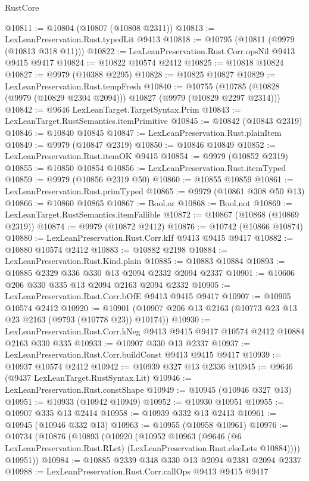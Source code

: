 \begin{lexlean}{RustCore}
\begin{coremodule}
@10811 := @10804 (@10807 (@10808 @2311))
@10813 := LexLeanPreservation.Rust.typedLit @9413
@10818 := @10795 (@10811 (@9979 (@10813 @318 @11)))
@10822 := LexLeanPreservation.Rust.Corr.opsNil @9413 @9415 @9417
@10824 := @10822 @10574 @2412
@10825 := @10818 @10824
@10827 := @9979 (@10388 @2295)
@10828 := @10825 @10827
@10829 := LexLeanPreservation.Rust.tempFresh
@10840 := @10755 (@10785 (@10828 (@9979 (@10829 @2304 @2094))) @10827 (@9979 (@10829 @2297 @2314)))
@10842 := @9646 LexLeanTarget.TargetSyntax.Prim
@10843 := LexLeanTarget.RustSemantics.itemPrimitive
@10845 := @10842 (@10843 @2319)
@10846 := @10840 @10845
@10847 := LexLeanPreservation.Rust.plainItem
@10849 := @9979 (@10847 @2319)
@10850 := @10846 @10849
@10852 := LexLeanPreservation.Rust.itemOK @9415
@10854 := @9979 (@10852 @2319)
@10855 := @10850 @10854
@10856 := LexLeanPreservation.Rust.itemTyped
@10859 := @9979 (@10856 @2319 @50)
@10860 := @10855 @10859
@10861 := LexLeanPreservation.Rust.primTyped
@10865 := @9979 (@10861 @308 @50 @13)
@10866 := @10860 @10865
@10867 := Bool.or
@10868 := Bool.not
@10869 := LexLeanTarget.RustSemantics.itemFallible
@10872 := @10867 (@10868 (@10869 @2319))
@10874 := @9979 (@10872 @2412)
@10876 := @10742 (@10866 @10874)
@10880 := LexLeanPreservation.Rust.Corr.kIf @9413 @9415 @9417
@10882 := @10880 @10574 @2412
@10883 := @10882 @2198
@10884 := LexLeanPreservation.Rust.Kind.plain
@10885 := @10883 @10884
@10893 := @10885 @2329 @336 @330 @13 @2094 @2332 @2094 @2337
@10901 := @10606 @206 @330 @335 @13 @2094 @2163 @2094 @2332
@10905 := LexLeanPreservation.Rust.Corr.bOfE @9413 @9415 @9417
@10907 := @10905 @10574 @2412
@10920 := @10901 (@10907 @206 @13 @2163 (@10773 @23 @13 @23 @2163 (@9793 (@10778 @23)) @10174))
@10930 := LexLeanPreservation.Rust.Corr.kNeg @9413 @9415 @9417 @10574 @2412 @10884 @2163 @330 @335
@10933 := @10907 @330 @13 @2337
@10937 := LexLeanPreservation.Rust.Corr.buildConst @9413 @9415 @9417
@10939 := @10937 @10574 @2412
@10942 := @10939 @327 @13 @2336
@10945 := @9646 (@9437 LexLeanTarget.RustSyntax.Lit)
@10946 := LexLeanPreservation.Rust.constShape
@10949 := @10945 (@10946 @327 @13)
@10951 := @10933 (@10942 @10949)
@10952 := @10930 @10951
@10955 := @10907 @335 @13 @2414
@10958 := @10939 @332 @13 @2413
@10961 := @10945 (@10946 @332 @13)
@10963 := @10955 (@10958 @10961)
@10976 := @10734
    (@10876
      (@10893
        (@10920
          (@10952
            @10963
            (@9646 (@6 LexLeanPreservation.Rust.RLet) (LexLeanPreservation.Rust.elseLets @10884))))
        @10951))
@10984 := @10885 @2339 @348 @330 @13 @2094 @2381 @2094 @2337
@10988 := LexLeanPreservation.Rust.Corr.callOps @9413 @9415 @9417

\end{coremodule}
\end{lexlean}
